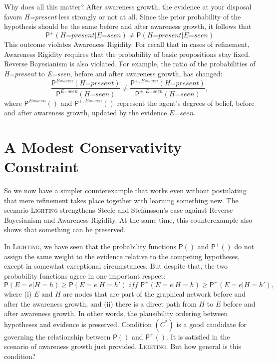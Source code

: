 \documentclass[
  11pt,
  dvipsnames,enabledeprecatedfontcommands]{scrartcl}
\newcommand{\pr}[1]{\ensuremath{\mathsf{P}(#1)}}
\newcommand{\ppr}[2]{\ensuremath{\mathsf{P}^{#1}(#2)}}
\begin{document}
Why does all this matter? After awareness growth, the evidence at your
disposal favors \textit{H=present} less strongly or not at all. Since
the prior probability of the hypothesis should be the same before and
after awareness growth, it follows that
\[\ppr{+}{\textit{H=present} \vert \textit{E=seen}} \neq \pr{\textit{H=present} \vert \textit{E=seen}}\]
This outcome violates Awareness Rigidity. For recall that in cases of
refinement, Awareness Rigidity requires that the probability of basic
propositions stay fixed. Reverse Bayesianism is also violated. For
example, the ratio of the probabilities of \textit{H=present} to
\textit{E=seen}, before and after awareness growth, has changed:
\[\frac{\ppr{\textit{E=seen}}{\textit{H=present}}}{\ppr{ \textit{E=seen}}{\textit{H=seen}}} \neq \frac{\ppr{+, \textit{E=seen}}{\textit{H=present}}}{\ppr{+, \textit{E=seen}}{\textit{H=seen}}},\]
where \(\ppr{\textit{E=seen}}{}\) and \(\ppr{+, \textit{E=seen}}{}\)
represent the agent's degrees of belief, before and after awareness
growth, updated by the evidence \(\textit{E=seen}\).

\hypertarget{a-modest-conservativity-constraint}{%
\section{A Modest Conservativity
Constraint}\label{a-modest-conservativity-constraint}}

So we now have a simpler counterexample that works even without
postulating that mere refinement takes place together with learning
something new. The scenario \textsc{Lighting} strengthens Steele and
Stefánsson's case against Reverse Bayesianism and Awareness Rigidity. At
the same time, this counterexample also shows that something can be
preserved.

In \textsc{Lighting}, we have seen that the probability functions
\(\pr{}\) and \(\ppr{+}{}\) do not assign the same weight to the
evidence relative to the competing hypotheses, except in somewhat
exceptional circumstances. But despite that, the two probability
functions agree in one important respect:
\[\pr{E=e \vert H=h} \geq \pr{E=e \vert H=h'} \textit{ iff } \ppr{+}{E=e \vert H=h} \geq \ppr{+}{E=e \vert H=h'} \tag{$C^*$},\]
where (i) \(E\) and \(H\) are nodes that are part of the graphical
network before and after the awareness growth, and (ii) there is a
direct path from \(H\) to \(E\) before and after awareness
growth. In other words,
the plausibility ordering between hypotheses and evidence is preserved.
Condition \((C^*)\) is a good candidate for governing the relationship
between \(\pr{}\) and \(\ppr{+}{}\). It is satisfied in the scenario of
awareness growth just provided, \textsc{Lighting}. But how general is
this condition?
\end{document}
